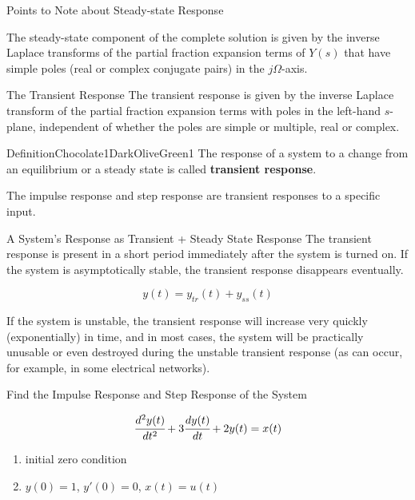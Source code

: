 \documentclass[aspectratio=169,xcolor=dvipsnames,svgnames,x11names,fleqn]{beamer}
\begin{document}
\begin{frame}{Points to Note about Steady-state Response}
    \begin{center}
        The steady-state component of the complete solution is given by the inverse Laplace transforms of the partial fraction expansion terms of $Y(s)$ that have simple poles (real or complex conjugate pairs) in the $j\Omega$-axis.


    \end{center}
\end{frame}

\begin{frame}{The Transient Response}
    The transient response is given by the inverse Laplace transform of the partial fraction expansion terms with poles in the left-hand $s$-plane, independent of whether the poles are simple or multiple, real or complex.

    \begin{custombox}{Definition}{Chocolate1}{DarkOliveGreen1}
        The response of a system to a change from an equilibrium or a steady state is called \textbf{transient response}.

        The impulse response and step response are transient responses to a specific input.
    \end{custombox}
\end{frame}

\begin{frame}{A System’s Response as Transient + Steady State Response}
    The transient response is present in a short period immediately after the system is turned on. If the system is asymptotically stable, the transient response disappears eventually.

    $$
    y(t) = y_{tr}(t)+ y_{ss}(t) 
    $$

    If the system is unstable, the transient response will increase very quickly (exponentially) in time, and in most cases, the system will be practically unusable or even destroyed during the unstable transient response (as can occur, for example, in some electrical networks).

\end{frame}

\begin{frame}{Find the Impulse Response and Step Response of the System}
 \vspace*{-5\baselineskip}
 
    $$
    \cfrac{d^2y(t)}{dt^2} + 3\cfrac{dy(t)}{dt} + 2 y(t) =  x(t)
    $$
    \begin{enumerate}
        \item initial zero condition

\item $y(0) = 1$, $y'(0) = 0$, $x(t) = u(t)$

    \end{enumerate}
\end{frame}
\end{document}
